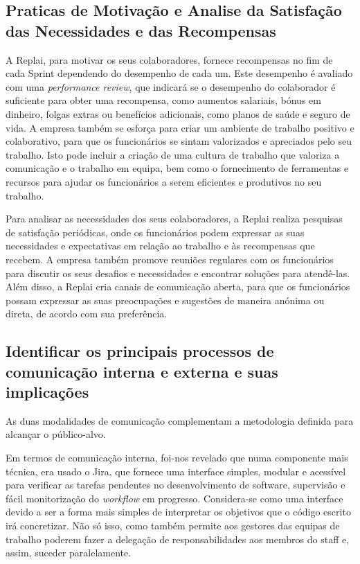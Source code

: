 \subsection{Praticas de Motivação e Analise da Satisfação das Necessidades e das Recompensas}

A Replai, para motivar os seus colaboradores, fornece recompensas no fim de cada Sprint dependendo do desempenho de cada um. Este desempenho é avaliado com uma \textit{performance review}, que indicará se o desempenho do colaborador é suficiente para obter uma recompensa, como aumentos salariais, bónus em dinheiro, folgas extras ou benefícios adicionais, como planos de saúde e seguro de vida. A empresa também se esforça para criar um ambiente de trabalho positivo e colaborativo, para que os funcionários se sintam valorizados e apreciados pelo seu trabalho. Isto pode incluir a criação de uma cultura de trabalho que valoriza a comunicação e o trabalho em equipa, bem como o fornecimento de ferramentas e recursos para ajudar os funcionários a serem eficientes e produtivos no seu trabalho.

Para analisar as necessidades dos seus colaboradores, a Replai realiza pesquisas de satisfação periódicas, onde os funcionários podem expressar as suas necessidades e expectativas em relação ao trabalho e às recompensas que recebem. A empresa também promove reuniões regulares com os funcionários para discutir os seus desafios e necessidades e encontrar soluções para atendê-las. Além disso, a Replai cria canais de comunicação aberta, para que os funcionários possam expressar as suas preocupações e sugestões de maneira anónima ou direta, de acordo com sua preferência.

\subsection{Identificar os principais processos de comunicação interna e externa e suas implicações}

As duas modalidades de comunicação complementam a metodologia definida para alcançar o público-alvo.
  
Em termos de comunicação interna, foi-nos revelado que numa componente mais técnica, era usado o Jira, que fornece uma interface simples, modular e acessível para verificar as tarefas pendentes no desenvolvimento de software, supervisão e fácil monitorização do \textit{workflow} em progresso. Considera-se como uma interface devido a ser a forma mais simples de interpretar os objetivos que o código escrito irá concretizar. Não só isso, como também permite aos gestores das equipas de trabalho poderem fazer a delegação de responsabilidades aos membros do staff e, assim, suceder paralelamente.
  
